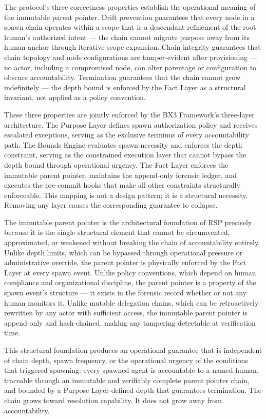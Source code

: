 The protocol's three correctness properties establish the operational meaning of the immutable parent pointer. Drift prevention guarantees that every node in a spawn chain operates within a scope that is a descendant refinement of the root human's authorized intent --- the chain cannot migrate purpose away from its human anchor through iterative scope expansion. Chain integrity guarantees that chain topology and node configurations are tamper-evident after provisioning --- no actor, including a compromised node, can alter parentage or configuration to obscure accountability. Termination guarantees that the chain cannot grow indefinitely --- the depth bound is enforced by the Fact Layer as a structural invariant, not applied as a policy convention.

These three properties are jointly enforced by the BX3 Framework's three-layer architecture. The Purpose Layer defines spawn authorization policy and receives escalated exceptions, serving as the exclusive terminus of every accountability path. The Bounds Engine evaluates spawn necessity and enforces the depth constraint, serving as the constrained execution layer that cannot bypass the depth bound through operational urgency. The Fact Layer enforces the immutable parent pointer, maintains the append-only forensic ledger, and executes the pre-commit hooks that make all other constraints structurally enforceable. This mapping is not a design pattern; it is a structural necessity. Removing any layer causes the corresponding guarantee to collapse.

The immutable parent pointer is the architectural foundation of RSP precisely because it is the single structural element that cannot be circumvented, approximated, or weakened without breaking the chain of accountability entirely. Unlike depth limits, which can be bypassed through operational pressure or administrative override, the parent pointer is physically enforced by the Fact Layer at every spawn event. Unlike policy conventions, which depend on human compliance and organizational discipline, the parent pointer is a property of the spawn event's structure --- it exists in the forensic record whether or not any human monitors it. Unlike mutable delegation chains, which can be retroactively rewritten by any actor with sufficient access, the immutable parent pointer is append-only and hash-chained, making any tampering detectable at verification time.

This structural foundation produces an operational guarantee that is independent of chain depth, spawn frequency, or the operational urgency of the conditions that triggered spawning: every spawned agent is accountable to a named human, traceable through an immutable and verifiably complete parent pointer chain, and bounded by a Purpose Layer-defined depth that guarantees termination. The chain grows toward resolution capability. It does not grow away from accountability.

